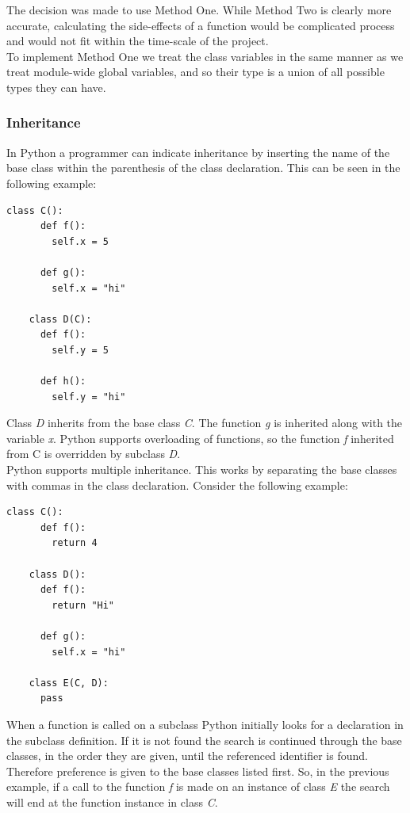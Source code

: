 \documentclass[12pt, titlepage]{article}
\begin{document}
The decision was made to use Method One. While Method Two is clearly more accurate, calculating the side-effects of a function would be complicated process and would not fit within the time-scale of the project. \\
\indent To implement Method One we treat the class variables in the same manner as we treat module-wide global variables, and so their type is a union of all possible types they can have.


\subsubsection{Inheritance}
In Python a programmer can indicate inheritance by inserting the name of the base class within the parenthesis of the class declaration. This can be seen in the following example:
\begin{lstlisting}[mathescape]
	class C():
	  def f():
	    self.x = 5
		
	  def g():
	    self.x = "hi"

	class D(C):
	  def f():
	    self.y = 5
		
	  def h():
	    self.y = "hi"
\end{lstlisting}
Class \textit{D} inherits from the base class \textit{C}. The function \textit{g} is inherited along with the variable \textit{x}. Python supports overloading of functions, so the function \textit{f} inherited from C is overridden by subclass \textit{D}. \\
\indent Python supports multiple inheritance. This works by separating the base classes with commas in the class declaration. Consider the following example: 
\begin{lstlisting}[mathescape]
	class C():
	  def f():
	    return 4
	    
	class D():
	  def f():
	    return "Hi"
	    
	  def g():
	    self.x = "hi"

	class E(C, D):
	  pass
\end{lstlisting}
When a function is called on a subclass Python initially looks for a declaration in the subclass definition. If it is not found the search is continued through the base classes, in the order they are given, until the referenced identifier is found. Therefore preference is given to the base classes listed first. So, in the previous example, if a call to the function \textit{f} is made on an instance of class \textit{E} the search will end at the function instance in class \textit{C}. \\
\end{document}
